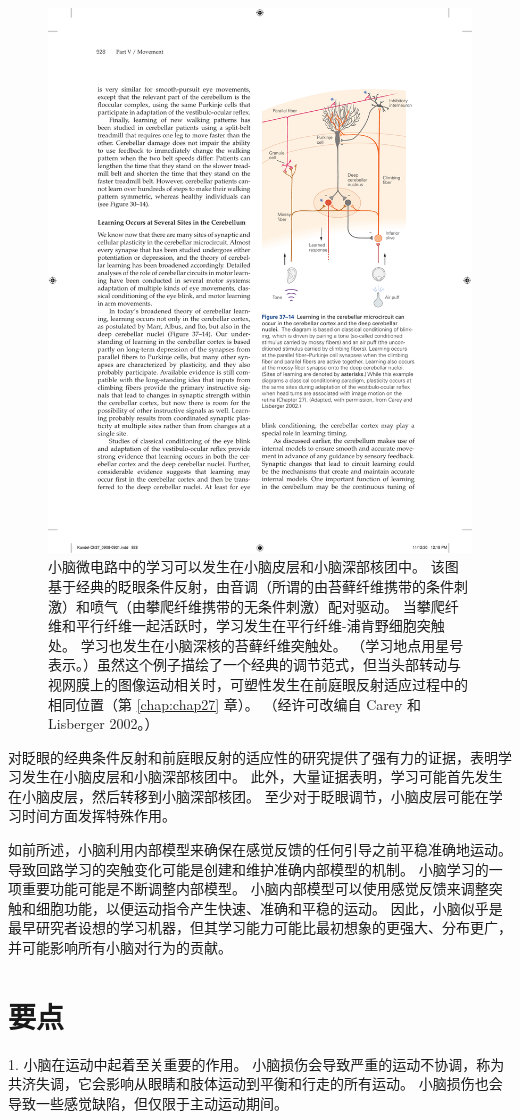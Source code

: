 \begin{figure}[htbp]
	\centering
	\includegraphics[width=0.5\linewidth]{chap37/fig_37_14}
	\caption{小脑微电路中的学习可以发生在小脑皮层和小脑深部核团中。 该图基于经典的眨眼条件反射，由音调（所谓的由苔藓纤维携带的条件刺激）和喷气（由攀爬纤维携带的无条件刺激）配对驱动。 当攀爬纤维和平行纤维一起活跃时，学习发生在平行纤维-浦肯野细胞突触处。 学习也发生在小脑深核的苔藓纤维突触处。 （学习地点用星号表示。）虽然这个例子描绘了一个经典的调节范式，但当头部转动与视网膜上的图像运动相关时，可塑性发生在前庭眼反射适应过程中的相同位置（第 \ref{chap:chap27} 章）。 （经许可改编自 Carey 和 Lisberger 2002。）}
	\label{fig:37_14}
\end{figure}

对眨眼的经典条件反射和前庭眼反射的适应性的研究提供了强有力的证据，表明学习发生在小脑皮层和小脑深部核团中。 此外，大量证据表明，学习可能首先发生在小脑皮层，然后转移到小脑深部核团。 至少对于眨眼调节，小脑皮层可能在学习时间方面发挥特殊作用。

如前所述，小脑利用内部模型来确保在感觉反馈的任何引导之前平稳准确地运动。 导致回路学习的突触变化可能是创建和维护准确内部模型的机制。 小脑学习的一项重要功能可能是不断调整内部模型。 小脑内部模型可以使用感觉反馈来调整突触和细胞功能，以便运动指令产生快速、准确和平稳的运动。 因此，小脑似乎是最早研究者设想的学习机器，但其学习能力可能比最初想象的更强大、分布更广，并可能影响所有小脑对行为的贡献。


\section{要点}
1. 小脑在运动中起着至关重要的作用。 小脑损伤会导致严重的运动不协调，称为共济失调，它会影响从眼睛和肢体运动到平衡和行走的所有运动。 小脑损伤也会导致一些感觉缺陷，但仅限于主动运动期间。

